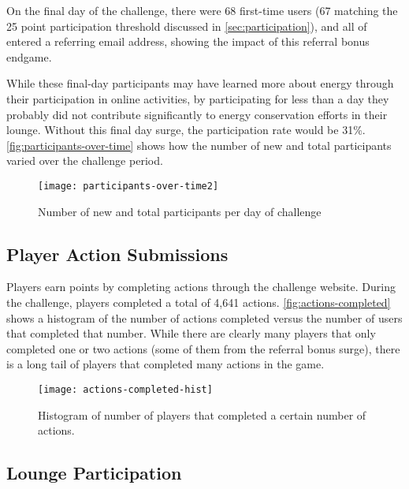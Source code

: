 On the final day of the challenge, there were 68 first-time users (67 matching the 25 point participation threshold discussed in \autoref{sec:participation}), and all of entered a referring email address, showing the impact of this referral bonus endgame.

While these final-day participants may have learned more about energy through their participation in online activities, by participating for less than a day they probably did not contribute significantly to energy conservation efforts in their lounge. Without this final day surge, the participation rate would be 31\%. \autoref{fig:participants-over-time} shows how the number of new and total participants varied over the challenge period.

\begin{figure}[htbp]
	\centering
	\texttt{[image: participants-over-time2]}
	\caption{Number of new and total participants per day of challenge}
	\label{fig:participants-over-time}
\end{figure}




\subsection{Player Action Submissions}

Players earn points by completing actions through the challenge website. During the challenge, players completed a total of 4,641 actions. \autoref{fig:actions-completed} shows a histogram of the number of actions completed versus the number of users that completed that number. While there are clearly many players that only completed one or two actions (some of them from the referral bonus surge), there is a long tail of players that completed many actions in the game.

\begin{figure}[htbp]
	\centering
	\texttt{[image: actions-completed-hist]}
	\caption{Histogram of number of players that completed a certain number of actions.}
	\label{fig:actions-completed}
\end{figure}


\subsection{Lounge Participation}
\label{sec:lounge-participation}

